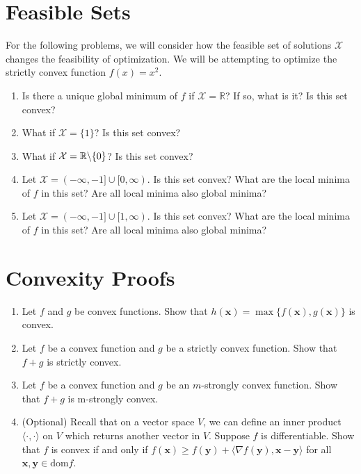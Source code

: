 \documentclass{article}
\begin{document}
\section{Feasible Sets}
For the following problems, we will consider how the feasible set of solutions $\mathcal{X}$ changes the feasibility of optimization. We will be attempting to optimize the strictly convex function $f(x) = x^2$.
\begin{enumerate}[label=\arabic*.]
\item Is there a unique global minimum of $f$ if $\mathcal{X} = \mathbb{R}$? If so, what is it? Is this set convex?
\item What if $\mathcal{X} = \{ 1\}$? Is this set convex?
\item What if $\mathcal{X} = \mathbb{R} \char`\\ \{ 0 \}$? Is this set convex?
\item Let $\mathcal{X} = (-\infty, -1] \cup [0, \infty )$. Is this set convex? What are the local minima of $f$ in this set? Are all local minima also global minima?
\item Let $\mathcal{X} = (-\infty, -1] \cup [1, \infty )$. Is this set convex? What are the local minima of $f$ in this set? Are all local minima also global minima?
\end{enumerate}

\section{Convexity Proofs}
\begin{enumerate}[label=\arabic*.]
\item Let $f$ and $g$ be convex functions. Show that $h(\mathbf{x}) = \max \{f(\mathbf{x}), g(\mathbf{x})\}$ is convex.
\item Let $f$ be a convex function and $g$ be a strictly convex function. Show that $f + g$ is strictly convex.
\item Let $f$ be a convex function and $g$ be an $m$-strongly convex function. Show that $f + g$ is m-strongly convex.
\item (Optional) Recall that on a vector space $V$, we can define an inner product $\langle\cdot, \cdot\rangle$ on $V$ which returns another vector in $V$. Suppose $f$ is differentiable. Show that $f$ is convex if and only if $f(\mathbf{x}) \geq f(\mathbf{y}) + \langle\nabla f(\mathbf{y}), \mathbf{x - y}\rangle$ for all $\mathbf{x, y} \in \text{dom}f$.
\end{enumerate}
\end{document}
